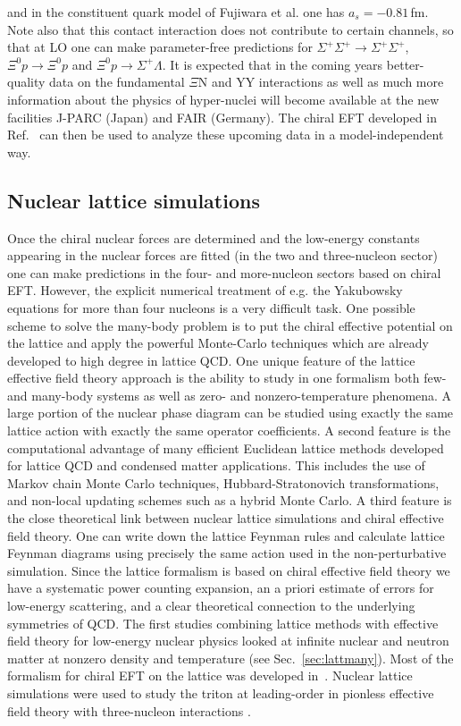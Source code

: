 \documentclass[aps,rmp,nofootinbib,twocolumn,floatfix]{revtex4}
\begin{document}
\cite{Rijken:2006kg} and in  the constituent quark model of
Fujiwara et al. \cite{Fujiwara:2006yh} one has  $a_s = -0.81\,$fm. 
Note also that this contact interaction does not contribute to certain
channels, so that at LO one can make parameter-free predictions for
$\Sigma^+\Sigma^+ \to \Sigma^+\Sigma^+$, $\Xi^0 p \to \Xi^0 p$ and
$\Xi^0 p \to \Sigma^+ \Lambda$. 
It is expected that in the coming years better-quality data on the fundamental 
$\Xi$N and YY interactions as well as much more information about the
physics  of hyper-nuclei will become available at the new facilities J-PARC
(Japan) and FAIR (Germany). The chiral EFT developed in
Ref.~\cite{Polinder:2007mp} 
can then be used  to analyze these upcoming data in a model-independent way.

\subsection{Nuclear lattice simulations}
\label{sec:fblatt}


Once the chiral nuclear forces are determined and the low-energy constants
appearing in the nuclear forces are fitted (in the two and three-nucleon
sector) one can make predictions in the four- and more-nucleon sectors
based on chiral EFT. However, the explicit numerical 
treatment of e.g. the 
Yakubowsky equations for more than four nucleons is a very
difficult task. One possible scheme to solve  the many-body problem is to put 
the chiral effective potential on the lattice and apply the powerful 
Monte-Carlo techniques which are already developed to high degree in lattice
QCD. One unique feature of the lattice effective field theory approach is the
ability to study in one formalism both few- and many-body systems as well as
zero- and nonzero-temperature phenomena. A large portion of the nuclear
phase diagram can be studied using exactly the same lattice action with
exactly the same operator coefficients. A second feature is the
computational advantage of many efficient Euclidean lattice methods developed
for lattice QCD and condensed matter applications.  This includes the use of
Markov chain Monte Carlo techniques, Hubbard-Stratonovich transformations, 
and non-local updating schemes such as a hybrid Monte Carlo. 
A third feature is the close theoretical link between nuclear lattice 
simulations and chiral effective field theory. One can write down the 
lattice Feynman rules and calculate lattice Feynman diagrams using precisely 
the same action used in the non-perturbative simulation. Since the lattice 
formalism is based on chiral effective field theory we have a systematic 
power counting expansion, an a priori estimate of errors for low-energy
scattering, and a clear theoretical connection to the underlying symmetries of QCD.
The first  studies combining lattice methods with effective field theory for
low-energy nuclear physics looked at infinite nuclear and neutron matter at
nonzero density and temperature (see Sec.~\ref{sec:lattmany}). Most of the
formalism for chiral EFT on the lattice was developed in~\cite{Lee:2004si}.
Nuclear lattice simulations were used to study the triton at leading-order in
pionless effective field theory with three-nucleon interactions
\cite{Borasoy:2005yc}. 
\end{document}
